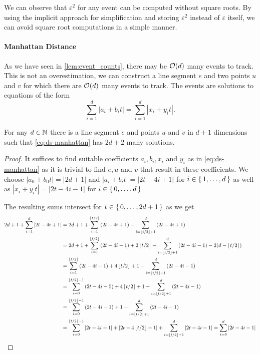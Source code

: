 We can observe that \(\varepsilon^2\) for any event can be computed without square roots. By using the implicit approach for simplification and storing \(\varepsilon^2\) instead of \(\varepsilon\) itself, we can avoid square root computations in a simple manner. 

\paragraph{Manhattan Distance}

As we have seen in \cref{lem:event_counts}, there may be \(\mathcal{O}(d)\) many events to track. This is not an overestimation, we can construct a line segment \(e\) and two points \(u\) and \(v\) for which there are \(\mathcal{O}(d)\) many events to track. The events are solutions to equations of the form 
\begin{equation}\label{eq:ds-manhattan}
	\sum_{i=1}^d |a_i + b_i t| = \sum_{i=1}^d |x_i + y_i t|.
\end{equation}

\begin{lemma}\label{lem:ds-manhattan}
	For any \(d \in \mathbb{N}\) there is a line segment \(e\) and points \(u\) and \(v\) in \(d+1\) dimensions such that \cref{eq:ds-manhattan} has \(2d + 2\) many solutions. 
\end{lemma}

\begin{proof}
	It suffices to find suitable coefficients \(a_i, b_i, x_i\) and \(y_i\) as in \cref{eq:ds-manhattan} as it is trivial to find \(e, u\) and \(v\) that result in these coefficients. We choose \(|a_0 + b_0 t| = |2d +1|\) and \(|a_i + b_i t| = |2t - 4i + 1|\) for \(i \in \set{1, \dots, d}\) as well as \(|x_i + y_i t| = |2t - 4i - 1|\) for \(i \in \set{0, \dots, d}\).

	The resulting sums intersect for \(t \in \set{0, \dots, 2d+1}\) as we get 
	\begin{align*}
		2d+1 + \sum_{i=1}^d \left|2t - 4i + 1\right| &= 2d+1 + \sum_{i=1}^{\left\lfloor t/2\right\rfloor} \left(2t - 4i + 1\right)  - \sum_{i=\left\lfloor t/2\right\rfloor+1}^d \left(2t - 4i + 1\right) \\
		 &= 2d+1 + \sum_{i=1}^{\left\lfloor t/2\right\rfloor} \left(2t - 4i - 1\right) + 2\left\lfloor t/2\right\rfloor - \sum_{i=\left\lfloor t/2\right\rfloor+1}^d \left(2t - 4i - 1\right)  - 2(d-\left\lfloor t/2\right\rfloor)\\
		 &= \sum_{i=1}^{\left\lfloor t/2\right\rfloor} \left(2t - 4i - 1\right) + 4\left\lfloor t/2\right\rfloor + 1 - \sum_{i=\left\lfloor t/2\right\rfloor+1}^d \left(2t - 4i - 1\right) \\
		 &= \sum_{i=0}^{\left\lfloor t/2\right\rfloor-1} \left(2t - 4i - 5\right) + 4\left\lfloor t/2\right\rfloor + 1 - \sum_{i=\left\lfloor t/2\right\rfloor+1}^d \left(2t - 4i - 1\right) \\
		 &= \sum_{i=0}^{\left\lfloor t/2\right\rfloor-1} \left(2t - 4i - 1\right) + 1 - \sum_{i=\left\lfloor t/2\right\rfloor+1}^d \left(2t - 4i - 1\right) \\
		 &= \sum_{i=0}^{\left\lfloor t/2\right\rfloor-1} \left|2t - 4i - 1\right| + \left|2t - 4\left\lfloor t/2\right\rfloor-1\right|+ \sum_{i=\left\lfloor t/2\right\rfloor+1}^d \left|2t - 4i - 1\right| = \sum_{i=0}^d \left|2t - 4i - 1\right|
	\end{align*}
\end{proof}

